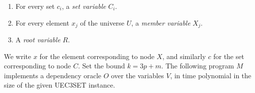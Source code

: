 \documentclass{elsarticle}%
\newcommand{\X}{X}
\newcommand{\C}{C}
\renewcommand{\c}{c}
\newcommand{\x}{x}
\begin{document}
\begin{enumerate}
\item For every set $c_{i}$, a {\em set variable} $C_{i}$.

\item For every element $x_{j}$ of the universe $U$, a {\em member variable} $X%
_{j}$.

\item A {\em root variable} $R$.
\end{enumerate}

We write $\x$ for the element corresponding to node $\X$, and similarly $\c$ for the set corresponding to node $\C$. 
Set the bound $k=3p+m$. The following program $M$ implements a dependency
oracle $O$ over the variables $V$, in time polynomial in the size of the given \textsc{UEC3SET} instance.
\end{document}
